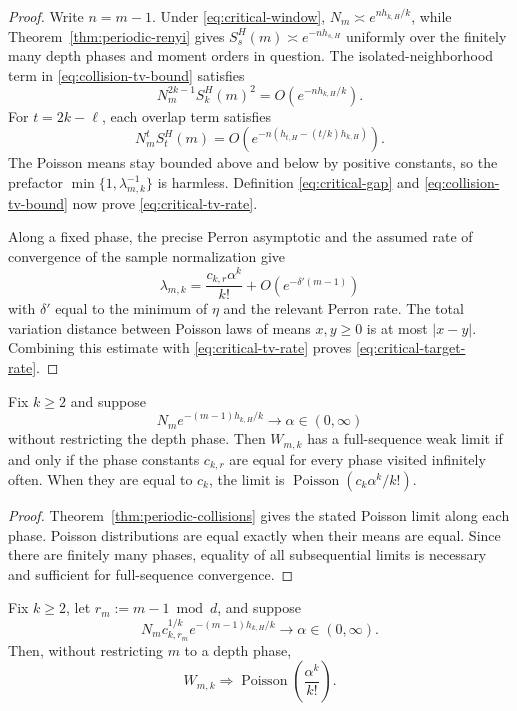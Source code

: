 \begin{proof}
Write \(n=m-1\).  Under \eqref{eq:critical-window},
\(N_m\asymp e^{nh_{k,H}/k}\), while
Theorem~\ref{thm:periodic-renyi} gives
\(S_s^H(m)\asymp e^{-nh_{s,H}}\) uniformly over the finitely many
depth phases and moment orders in question.  The isolated-neighborhood
term in \eqref{eq:collision-tv-bound} satisfies
\[
  N_m^{2k-1}S_k^H(m)^2
  =O(e^{-nh_{k,H}/k}).
\]
For \(t=2k-\ell\), each overlap term satisfies
\[
  N_m^tS_t^H(m)
  =O\!\left(
    e^{-n(h_{t,H}-(t/k)h_{k,H})}
  \right).
\]
The Poisson means stay bounded above and below by positive constants, so
the prefactor \(\min\{1,\lambda_{m,k}^{-1}\}\) is harmless.
Definition \eqref{eq:critical-gap} and
\eqref{eq:collision-tv-bound} now prove
\eqref{eq:critical-tv-rate}.

Along a fixed phase, the precise Perron asymptotic and the assumed rate
of convergence of the sample normalization give
\[
  \lambda_{m,k}
  =\frac{c_{k,r}\alpha^k}{k!}+O(e^{-\delta'(m-1)})
\]
with \(\delta'\) equal to the minimum of \(\eta\) and the relevant
Perron rate.  The total variation distance between Poisson laws of means
\(x,y\geq0\) is at most \(|x-y|\).  Combining this estimate with
\eqref{eq:critical-tv-rate} proves \eqref{eq:critical-target-rate}.
\end{proof}

\begin{corollary}
\label{cor:full-sequence-criterion}
Fix \(k\geq2\) and suppose
\[
  N_m e^{-(m-1)h_{k,H}/k}\longrightarrow\alpha\in(0,\infty)
\]
without restricting the depth phase.  Then \(W_{m,k}\) has a
full-sequence weak limit if and only if the phase constants
\(c_{k,r}\) are equal for every phase visited infinitely often.  When
they are equal to \(c_k\), the limit is
\(\operatorname{Poisson}(c_k\alpha^k/k!)\).
\end{corollary}

\begin{proof}
Theorem~\ref{thm:periodic-collisions} gives the stated Poisson limit
along each phase.  Poisson distributions are equal exactly when their
means are equal.  Since there are finitely many phases, equality of all
subsequential limits is necessary and sufficient for full-sequence
convergence.
\end{proof}

\begin{corollary}
\label{cor:phase-adjusted-normalization}
Fix \(k\geq2\), let
\(r_m:=m-1\bmod d\), and suppose
\begin{equation}
  N_m c_{k,r_m}^{1/k}
  e^{-(m-1)h_{k,H}/k}
  \longrightarrow\alpha\in(0,\infty).
  \label{eq:phase-adjusted-scale}
\end{equation}
Then, without restricting \(m\) to a depth phase,
\[
  W_{m,k}\Rightarrow
  \operatorname{Poisson}\!\left(\frac{\alpha^k}{k!}\right).
\]
\end{corollary}


